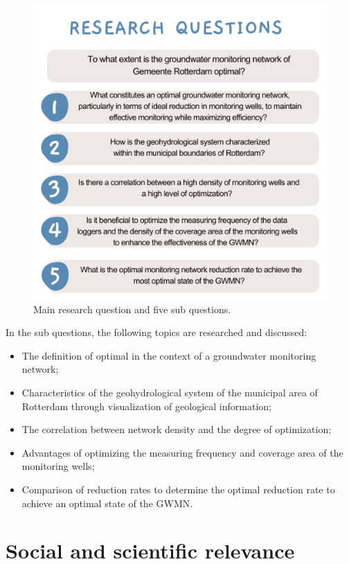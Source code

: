 \begin{figure}[htbp]
    \centering
    \includegraphics[width=0.75\linewidth]{figures/rq's-2.png}
    \caption{Main research question and five sub questions.}
    \label{Research questions}
\end{figure}
In the sub questions, the following topics are researched and discussed: 
\begin{itemize}
    \item The definition of optimal in the context of a groundwater monitoring network;
    \item Characteristics of the geohydrological system of the municipal area of Rotterdam through visualization of geological information;
    \item The correlation between network density and the degree of optimization;
    \item Advantages of optimizing the measuring frequency and coverage area of the monitoring wells;
    \item Comparison of reduction rates to determine the optimal reduction rate to achieve an optimal state of the GWMN.

\end{itemize}

\newpage

\section{Social and scientific relevance}

